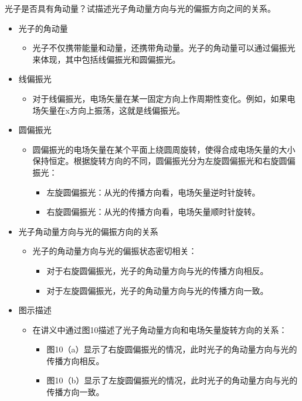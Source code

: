 \documentclass[dvipsnames, svgnames,a4paper,11pt]{article}
\begin{document}
	\begin{question}
		光子是否具有角动量？试描述光子角动量方向与光的偏振方向之间的关系。
	\end{question}
	\begin{itemize}
		\item 光子的角动量
		\begin{itemize}
			\item 光子不仅携带能量和动量，还携带角动量。光子的角动量可以通过偏振光来体现，其中包括线偏振光和圆偏振光。
		\end{itemize}
		
		\item 线偏振光
		\begin{itemize}
			\item 对于线偏振光，电场矢量在某一固定方向上作周期性变化。例如，如果电场矢量在x方向上振荡，这就是线偏振光。
		\end{itemize}
		
		\item 圆偏振光
		\begin{itemize}
			\item 圆偏振光的电场矢量在某个平面上绕圆周旋转，使得合成电场矢量的大小保持恒定。根据旋转方向的不同，圆偏振光分为左旋圆偏振光和右旋圆偏振光：
			\begin{itemize}
				\item 左旋圆偏振光：从光的传播方向看，电场矢量逆时针旋转。
				\item 右旋圆偏振光：从光的传播方向看，电场矢量顺时针旋转。
			\end{itemize}
		\end{itemize}
		
		\item 光子角动量方向与光的偏振方向的关系
		\begin{itemize}
			\item 光子的角动量方向与光的偏振状态密切相关：
			\begin{itemize}
				\item 对于右旋圆偏振光，光子的角动量方向与光的传播方向相反。
				\item 对于左旋圆偏振光，光子的角动量方向与光的传播方向一致。
			\end{itemize}
		\end{itemize}
		
		\item 图示描述
		\begin{itemize}
			\item 在讲义中通过图10描述了光子角动量方向和电场矢量旋转方向的关系：
			\begin{itemize}
				\item 图10（a）显示了右旋圆偏振光的情况，此时光子的角动量方向与光的传播方向相反。
				\item 图10（b）显示了左旋圆偏振光的情况，此时光子的角动量方向与光的传播方向一致。
			\end{itemize}
		\end{itemize}
		

\end{itemize}
\end{document}
